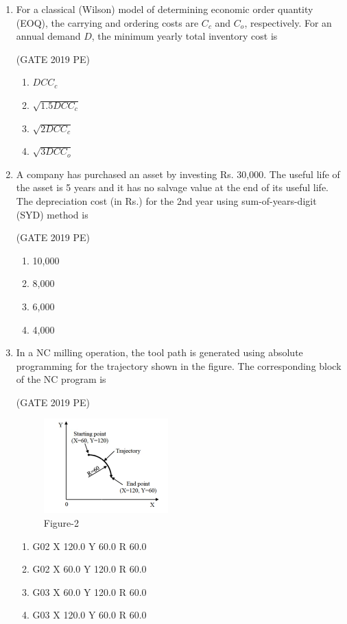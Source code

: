 \documentclass[journal,12pt,onecolumn]{exam}
\theoremstyle{remark}
\begin{document}
\begin{enumerate}
    \item For a classical (Wilson) model of determining economic order quantity (EOQ), the carrying and ordering costs are \( C_c \) and \( C_o \), respectively. For an annual demand \( D \), the minimum yearly total inventory cost is

     \hfill{(GATE 2019 PE)}\\
     \begin{enumerate}
         \item \(D C C_c\)
         \item \(\sqrt{1.5 D C C_c}\)
         \item \(\sqrt{2 D C C_c}\)
         \item \(\sqrt{3 D C C_o}\)
     \end{enumerate}
   
    \item A company has purchased an asset by investing Rs. 30,000. The useful life of the asset is 5 years and it has no salvage value at the end of its useful life. The depreciation cost (in Rs.) for the 2nd year using sum-of-years-digit (SYD) method is

     \hfill{(GATE 2019 PE)}\\
     \begin{enumerate}
         \item 10,000 
         \item  8,000
         \item 6,000 
         \item  4,000
     \end{enumerate}
   

    \item In a NC milling operation, the tool path is generated using absolute programming for the trajectory shown in the figure. The corresponding block of the NC program is

     \hfill{(GATE 2019 PE)}\\
     \begin{figure}[H]
         \centering
         \includegraphics[width=0.5\linewidth]{figs/fig2.png}
         \caption{Figure-2}
         \label{fig:figs/fig2.png}
     \end{figure}
     \begin{enumerate}
         \item G02 X 120.0 Y 60.0 R 60.0
         \item G02 X 60.0 Y 120.0 R 60.0
         \item G03 X 60.0 Y 120.0 R 60.0
         \item G03 X 120.0 Y 60.0 R 60.0
         

\end{enumerate}
\end{enumerate}
\end{document}
